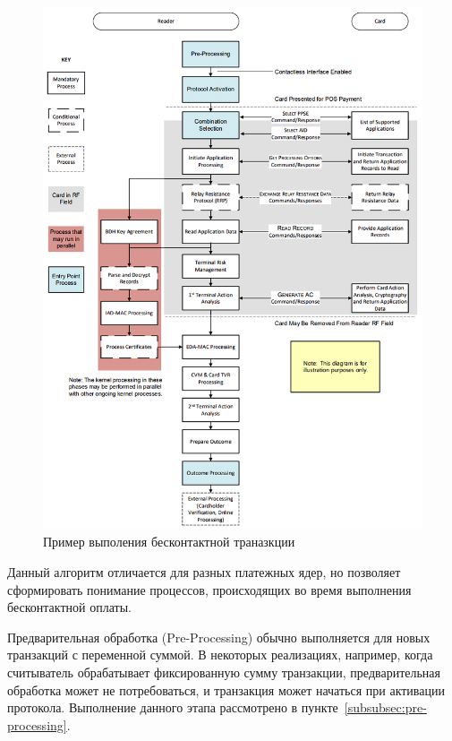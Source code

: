 \begin{figure}[H]
    \centering
    \includegraphics[width=1\textwidth]{images/research/kernel_transaction_flow}
    \caption{\centering Пример выполения бесконтактной траназкции}
    \label{fig:kernel_transaction_flow}
\end{figure}

Данный алгоритм отличается для разных платежных ядер, но позволяет сформировать понимание процессов, происходящих во время выполнения бесконтактной оплаты.

Предварительная обработка (Pre-Processing) обычно выполняется для новых транзакций с переменной суммой.
В некоторых реализациях, например, когда считыватель обрабатывает фиксированную сумму транзакции, предварительная обработка может не потребоваться, и транзакция может начаться при активации протокола.
Выполнение данного этапа рассмотрено в пункте~\ref{subsubsec:pre-processing}.

